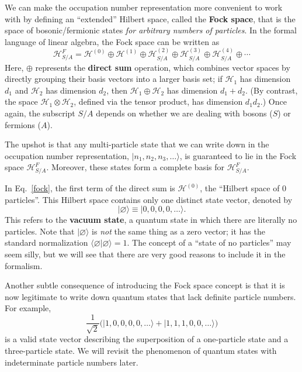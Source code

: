 \documentclass[pra,12pt]{revtex4-2}
\begin{document}
We can make the occupation number representation more convenient to
work with by defining an ``extended'' Hilbert space, called the
\textbf{Fock space}, that is the space of bosonic/fermionic states
\textit{for arbitrary numbers of particles}.  In the formal language
of linear algebra, the Fock space can be written as
\begin{equation}
  \mathscr{H}_{S/A}^F = \mathscr{H}^{(0)} \oplus \mathscr{H}^{(1)} \oplus \mathscr{H}^{(2)}_{S/A} \oplus \mathscr{H}^{(3)}_{S/A} \oplus \mathscr{H}^{(4)}_{S/A} \oplus \cdots
  \label{fock}
\end{equation}
Here, $\oplus$ represents the \textbf{direct sum} operation, which
combines vector spaces by directly grouping their basis vectors into a
larger basis set; if $\mathscr{H}_1$ has dimension $d_1$ and
$\mathscr{H}_2$ has dimension $d_2$, then
$\mathscr{H}_1\oplus\mathscr{H}_2$ has dimension $d_1+d_2$.  (By
contrast, the space $\mathscr{H}_1\otimes\mathscr{H}_2$, defined via
the tensor product, has dimension $d_1d_2$.)  Once again, the
subscript $S/A$ depends on whether we are dealing with bosons ($S$) or
fermions ($A$).

The upshot is that any multi-particle state that we can write down in
the occupation number representation, $|n_1,n_2,n_3,\dots\rangle$, is
guaranteed to lie in the Fock space $\mathscr{H}^{F}_{S/A}$.
Moreover, these states form a complete basis for
$\mathscr{H}^{F}_{S/A}$.

In Eq.~\eqref{fock}, the first term of the direct sum is
$\mathscr{H}^{(0)}$, the ``Hilbert space of 0 particles''.  This
Hilbert space contains only one distinct state vector, denoted by
\begin{equation}
  |\varnothing\rangle \equiv |0,0,0,0,\dots\rangle.
\end{equation}
This refers to the \textbf{vacuum state}, a quantum state in which
there are literally no particles.  Note that $|\varnothing\rangle$ is
\textit{not} the same thing as a zero vector; it has the standard
normalization $\langle\varnothing|\varnothing\rangle = 1$.  The
concept of a ``state of no particles'' may seem silly, but we will see
that there are very good reasons to include it in the formalism.

Another subtle consequence of introducing the Fock space concept is
that it is now legitimate to write down quantum states that lack
definite particle numbers.  For example,
\begin{equation*}
  \frac{1}{\sqrt{2}} \Big(|1,0,0,0,0,\dots\rangle + |1,1,1,0,0,\dots\rangle\Big)
\end{equation*}
is a valid state vector describing the superposition of a one-particle
state and a three-particle state.  We will revisit the phenomenon of
quantum states with indeterminate particle numbers later.
\end{document}
